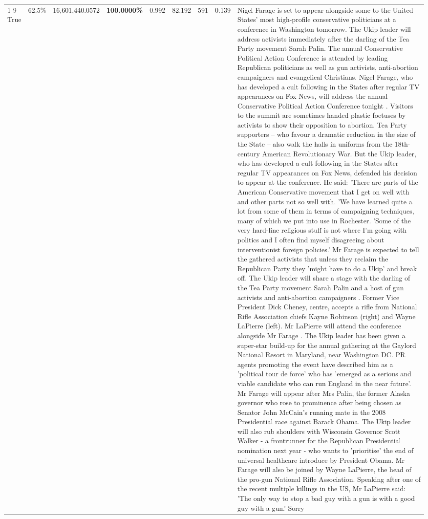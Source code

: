 \begin{table}[H]
\begin{tabular}{lllrlllll}
\cline{1-9} \cline{2-9}
True & 62.5\% & 16,601,440.0572 & \bfseries \color{red} 100.0000\% & 0.992 & 82.192 & 591 & 0.139 & Nigel Farage is set to appear alongside some to the United States' most high-profile conservative politicians at a conference in Washington tomorrow. The Ukip leader will address activists immediately after the darling of the Tea Party movement Sarah Palin. The annual Conservative Political Action Conference is attended by leading Republican politicians as well as gun activists, anti-abortion campaigners and evangelical Christians. Nigel Farage, who has developed a cult following in the States after regular TV appearances on Fox News, will address the annual Conservative Political Action Conference tonight . Visitors to the summit are sometimes handed plastic foetuses by activists to show their opposition to abortion. Tea Party supporters – who favour a dramatic reduction in the size of the State – also walk the halls in uniforms from the 18th-century American Revolutionary War. But the Ukip leader, who has developed a cult following in the States after regular TV appearances on Fox News, defended his decision to appear at the conference. He said: 'There are parts of the American Conservative movement that I get on well with and other parts not so well with. 'We have learned quite a lot from some of them in terms of campaigning techniques, many of which we put into use in Rochester. 'Some of the very hard-line religious stuff is not where I'm going with politics and I often find myself disagreeing about interventionist foreign policies.' Mr Farage is expected to tell the gathered activists that unless they reclaim the Republican Party they 'might have to do a Ukip' and break off. The Ukip leader will share a stage with the darling of the Tea Party movement Sarah Palin and a host of gun activists and anti-abortion campaigners . Former Vice President Dick Cheney, centre, accepts a rifle from National Rifle Association chiefs Kayne Robinson (right) and Wayne LaPierre (left). Mr LaPierre will attend the conference alongside Mr Farage . The Ukip leader has been given a super-star build-up for the annual gathering at the Gaylord National Resort in Maryland, near Washington DC. PR agents promoting the event have described him as a 'political tour de force' who has 'emerged as a serious and viable candidate who can run England in the near future'. Mr Farage will appear after Mrs Palin, the former Alaska governor who rose to prominence after being chosen as Senator John McCain's running mate in the 2008 Presidential race against Barack Obama. The Ukip leader will also rub shoulders with Wisconsin Governor Scott Walker - a frontrunner for the Republican Presidential nomination next year - who wants to 'prioritise' the end of universal healthcare introduce by President Obama. Mr Farage will also be joined by Wayne LaPierre, the head of the pro-gun National Rifle Association. Speaking after one of the recent multiple killings in the US, Mr LaPierre said: 'The only way to stop a bad guy with a gun is with a good guy with a gun.' Sorry \\

\end{tabular}
\end{table}
